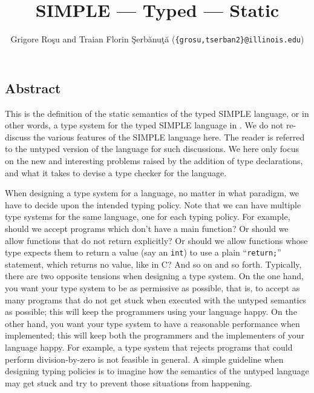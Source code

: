 \setlength{\parindent}{1em}
\title{SIMPLE --- Typed --- Static}
\author{Grigore Ro\c{s}u and 
        Traian Florin \c{S}erb\u{a}nu\c{t}\u{a}
        (\texttt{\{grosu,tserban2\}@illinois.edu})}

\maketitle

\begin{latexComment}
\section{Abstract}
This is the \K definition of the static semantics of the typed SIMPLE
language, or in other words, a type system for the typed SIMPLE
language in \K.  We do not re-discuss the various features of the
SIMPLE language here.  The reader is referred to the untyped version of
the language for such discussions.  We here only focus on the new and
interesting problems raised by the addition of type declarations, and
what it takes to devise a type checker for the language.

When designing a type system for a language, no matter in what
paradigm, we have to decide upon the intended typing policy.  Note
that we can have multiple type systems for the same language, one for
each typing policy.  For example, should we accept programs which
don't have a main function?  Or should we allow functions that do not
return explicitly?  Or should we allow functions whose type expects 
them to return a value (say an \texttt{int}) to use a plain
``\texttt{return;}'' statement, which returns no value, like in C?
And so on and so forth.  Typically, there are two opposite tensions
when designing a type system.  On the one hand, you want your type
system to be as permissive as possible, that is, to accept as many
programs that do not get stuck when executed with the untyped
semantics as possible; this will keep the programmers using your
language happy.  On  the other hand, you want your type system to have
a reasonable performance when implemented; this will keep both the
programmers and the implementers of your language happy.  For example,
a type system that rejects programs that could perform
division-by-zero is not feasible in general.  A simple guideline when
designing typing policies is to imagine how the semantics of the
untyped language may get stuck and try to prevent those situations
from happening.


\end{latexComment}
